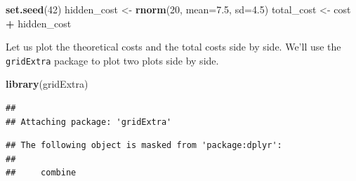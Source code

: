 \documentclass[
]{book}
\newenvironment{Shaded}{\begin{snugshade}}{\end{snugshade}}
\newcommand{\AttributeTok}[1]{\textcolor[rgb]{0.13,0.29,0.53}{#1}}
\newcommand{\DecValTok}[1]{\textcolor[rgb]{0.00,0.00,0.81}{#1}}
\newcommand{\FloatTok}[1]{\textcolor[rgb]{0.00,0.00,0.81}{#1}}
\newcommand{\FunctionTok}[1]{\textcolor[rgb]{0.13,0.29,0.53}{\textbf{#1}}}
\newcommand{\NormalTok}[1]{#1}
\newcommand{\OtherTok}[1]{\textcolor[rgb]{0.56,0.35,0.01}{#1}}
\newcommand{\SpecialCharTok}[1]{\textcolor[rgb]{0.81,0.36,0.00}{\textbf{#1}}}
\begin{document}
\begin{Shaded}
\begin{Highlighting}[]
\FunctionTok{set.seed}\NormalTok{(}\DecValTok{42}\NormalTok{)}
\NormalTok{hidden\_cost }\OtherTok{\textless{}{-}} \FunctionTok{rnorm}\NormalTok{(}\DecValTok{20}\NormalTok{, }\AttributeTok{mean=}\FloatTok{7.5}\NormalTok{, }\AttributeTok{sd=}\FloatTok{4.5}\NormalTok{)}
\NormalTok{total\_cost }\OtherTok{\textless{}{-}}\NormalTok{ cost }\SpecialCharTok{+}\NormalTok{ hidden\_cost}
\end{Highlighting}
\end{Shaded}

Let us plot the theoretical costs and the total costs side by side. We'll use the \texttt{gridExtra} package to plot two plots side by side.

\begin{Shaded}
\begin{Highlighting}[]
\FunctionTok{library}\NormalTok{(gridExtra)}
\end{Highlighting}
\end{Shaded}

\begin{verbatim}
## 
## Attaching package: 'gridExtra'
\end{verbatim}

\begin{verbatim}
## The following object is masked from 'package:dplyr':
## 
##     combine
\end{verbatim}
\end{document}

